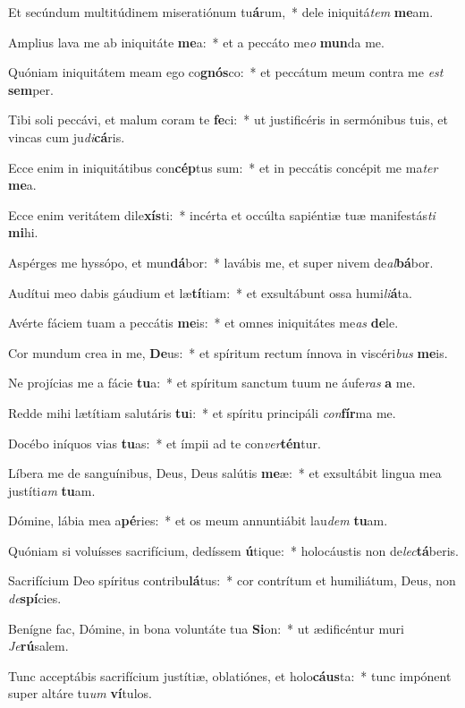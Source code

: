 \item Et secúndum multitúdinem miseratiónum tu\textbf{á}rum,~* dele iniquitá\textit{tem} \textbf{me}am.
\item Amplius lava me ab iniquitáte \textbf{me}a:~* et a peccáto me\textit{o} \textbf{mun}da me.
\item Quóniam iniquitátem meam ego co\textbf{gnós}co:~* et peccátum meum contra me \textit{est} \textbf{sem}per.
\item Tibi soli peccávi, et malum coram te \textbf{fe}ci:~* ut justificéris in sermónibus tuis, et vincas cum ju\textit{di}\textbf{cá}ris.
\item Ecce enim in iniquitátibus con\textbf{cép}tus sum:~* et in peccátis concépit me ma\textit{ter} \textbf{me}a.
\item Ecce enim veritátem dile\textbf{xís}ti:~* incérta et occúlta sapiéntiæ tuæ manifestás\textit{ti} \textbf{mi}hi.
\item Aspérges me hyssópo, et mun\textbf{dá}bor:~* lavábis me, et super nivem de\textit{al}\textbf{bá}bor.
\item Audítui meo dabis gáudium et læ\textbf{tí}tiam:~* et exsultábunt ossa humi\textit{li}\textbf{á}ta.
\item Avérte fáciem tuam a peccátis \textbf{me}is:~* et omnes iniquitátes me\textit{as} \textbf{de}le.
\item Cor mundum crea in me, \textbf{De}us:~* et spíritum rectum ínnova in viscéri\textit{bus} \textbf{me}is.
\item Ne projícias me a fácie \textbf{tu}a:~* et spíritum sanctum tuum ne áufe\textit{ras} \textbf{a} me.
\item Redde mihi lætítiam salutáris \textbf{tu}i:~* et spíritu principáli \textit{con}\textbf{fír}ma me.
\item Docébo iníquos vias \textbf{tu}as:~* et ímpii ad te con\textit{ver}\textbf{tén}tur.
\item Líbera me de sanguínibus, Deus, Deus salútis \textbf{me}æ:~* et exsultábit lingua mea justíti\textit{am} \textbf{tu}am.
\item Dómine, lábia mea a\textbf{pé}ries:~* et os meum annuntiábit lau\textit{dem} \textbf{tu}am.
\item Quóniam si voluísses sacrifícium, dedíssem \textbf{ú}tique:~* holocáustis non de\textit{lec}\textbf{tá}beris.
\item Sacrifícium Deo spíritus contribu\textbf{lá}tus:~* cor contrítum et humiliátum, Deus, non \textit{de}\textbf{spí}cies.
\item Benígne fac, Dómine, in bona voluntáte tua \textbf{Si}on:~* ut ædificéntur muri \textit{Je}\textbf{rú}salem.
\item Tunc acceptábis sacrifícium justítiæ, oblatiónes, et holo\textbf{cáus}ta:~* tunc impónent super altáre tu\textit{um} \textbf{ví}tulos.
